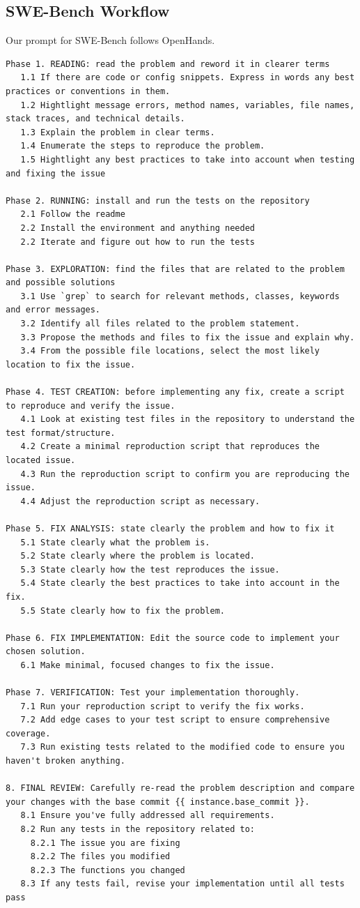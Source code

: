 \subsection{SWE-Bench Workflow}
Our prompt for SWE-Bench follows OpenHands.
{\footnotesize
\begin{Verbatim}[breaklines, breakanywhere]
Phase 1. READING: read the problem and reword it in clearer terms
   1.1 If there are code or config snippets. Express in words any best practices or conventions in them.
   1.2 Hightlight message errors, method names, variables, file names, stack traces, and technical details.
   1.3 Explain the problem in clear terms.
   1.4 Enumerate the steps to reproduce the problem.
   1.5 Hightlight any best practices to take into account when testing and fixing the issue

Phase 2. RUNNING: install and run the tests on the repository
   2.1 Follow the readme
   2.2 Install the environment and anything needed
   2.2 Iterate and figure out how to run the tests

Phase 3. EXPLORATION: find the files that are related to the problem and possible solutions
   3.1 Use `grep` to search for relevant methods, classes, keywords and error messages.
   3.2 Identify all files related to the problem statement.
   3.3 Propose the methods and files to fix the issue and explain why.
   3.4 From the possible file locations, select the most likely location to fix the issue.

Phase 4. TEST CREATION: before implementing any fix, create a script to reproduce and verify the issue.
   4.1 Look at existing test files in the repository to understand the test format/structure.
   4.2 Create a minimal reproduction script that reproduces the located issue.
   4.3 Run the reproduction script to confirm you are reproducing the issue.
   4.4 Adjust the reproduction script as necessary.

Phase 5. FIX ANALYSIS: state clearly the problem and how to fix it
   5.1 State clearly what the problem is.
   5.2 State clearly where the problem is located.
   5.3 State clearly how the test reproduces the issue.
   5.4 State clearly the best practices to take into account in the fix.
   5.5 State clearly how to fix the problem.

Phase 6. FIX IMPLEMENTATION: Edit the source code to implement your chosen solution.
   6.1 Make minimal, focused changes to fix the issue.

Phase 7. VERIFICATION: Test your implementation thoroughly.
   7.1 Run your reproduction script to verify the fix works.
   7.2 Add edge cases to your test script to ensure comprehensive coverage.
   7.3 Run existing tests related to the modified code to ensure you haven't broken anything.

8. FINAL REVIEW: Carefully re-read the problem description and compare your changes with the base commit {{ instance.base_commit }}.
   8.1 Ensure you've fully addressed all requirements.
   8.2 Run any tests in the repository related to:
     8.2.1 The issue you are fixing
     8.2.2 The files you modified
     8.2.3 The functions you changed
   8.3 If any tests fail, revise your implementation until all tests pass
\end{Verbatim}
}

